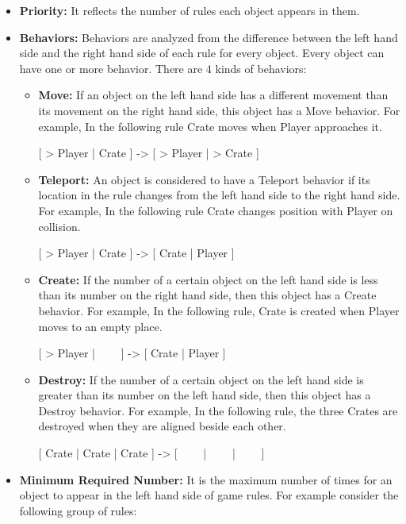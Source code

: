 \begin{itemize}
	\item \textbf{Priority:} It reflects the number of rules each object appears in them.
	\item \textbf{Behaviors:} Behaviors are analyzed from the difference between the left hand side and the right hand side of each rule for every object. Every object can have one or more behavior. There are 4 kinds of behaviors:
		\begin{itemize} \itemsep0pt \parskip0pt 
			\item \textbf{Move:} If an object on the left hand side has a different movement than its movement on the right hand side, this object has a Move behavior. For example, In the following rule Crate moves when Player approaches it.
			\begin{center}
				[ > Player | Crate ] -> [ > Player | > Crate ]
			\end{center}
			\item \textbf{Teleport:} An object is considered to have a Teleport behavior if its location in the rule changes from the left hand side to the right hand side. For example, In the following rule Crate changes position with Player on collision.
			\begin{center}
				[ > Player | Crate ] -> [ Crate | Player ]
			\end{center}
			\item \textbf{Create:} If the number of a certain object on the left hand side is less than its number on the right hand side, then this object has a Create behavior. For example, In the following rule, Crate is created when Player moves to an empty place.
			\begin{center}
				[ > Player | \ \ \ \ ] -> [ Crate | Player ]
			\end{center}
			\item \textbf{Destroy:} If the number of a certain object on the left hand side is greater than its number on the left hand side, then this object has a Destroy behavior. For example, In the following rule, the three Crates are destroyed when they are aligned beside each other.
			\begin{center}
				[ Crate | Crate | Crate ] -> [ \ \ \ \ | \ \ \ \ | \ \ \ \ ]
			\end{center}
		\end{itemize}
	\item \textbf{Minimum Required Number:} It is the maximum number of times for an object to appear in the left hand side of game rules. For example consider the following group of rules:

\end{itemize}
